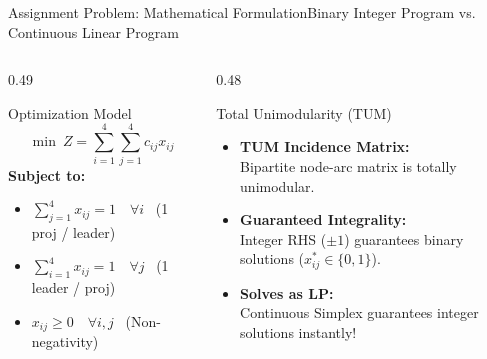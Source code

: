 \documentclass{beamer}
\begin{document}
\begin{frame}{Assignment Problem: Mathematical Formulation}{Binary Integer Program vs. Continuous Linear Program}
\begin{columns}[T]
\begin{column}{0.49\textwidth}
\begin{block}{Optimization Model}
\small
\[
\min \ Z = \sum_{i=1}^4 \sum_{j=1}^4 c_{ij} x_{ij}
\]
\vspace{-0.4em}
\textbf{Subject to:}
\begin{itemize}\setlength{\itemsep}{0.2em}
    \item $\sum_{j=1}^4 x_{ij} = 1 \quad \forall i$ \ \scriptsize(1 proj / leader)
    \item $\sum_{i=1}^4 x_{ij} = 1 \quad \forall j$ \ \scriptsize(1 leader / proj)
    \item $x_{ij} \ge 0 \quad \forall i, j$ \ \scriptsize(Non-negativity)
\end{itemize}
\end{block}
\end{column}

\begin{column}{0.48\textwidth}
\begin{alertblock}{Total Unimodularity (TUM)}
\small
\begin{itemize}\setlength{\itemsep}{0.3em}
    \item \textbf{TUM Incidence Matrix:}\\
    Bipartite node-arc matrix is totally unimodular.
    \item \textbf{Guaranteed Integrality:}\\
    Integer RHS ($\pm 1$) guarantees binary solutions ($x_{ij}^* \in \{0, 1\}$).
    \item \textbf{Solves as LP:}\\
    Continuous Simplex guarantees integer solutions instantly!
\end{itemize}
\end{alertblock}
\end{column}
\end{columns}
\end{frame}
\end{document}
